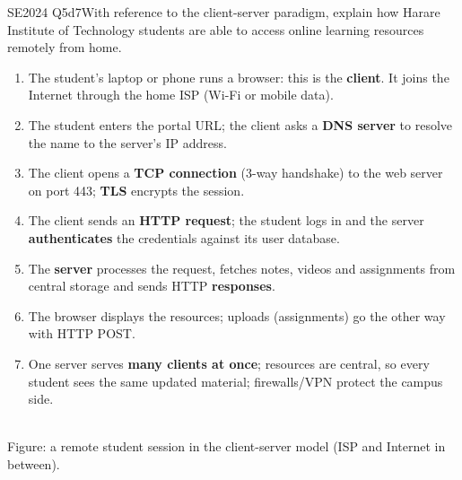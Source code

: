 \documentclass[10pt]{article}
\newcommand{\figcap}[1]{{\scriptsize\color{midgrey}#1}}
\begin{document}
\begin{pastq}{SE2024 Q5d}{7}With reference to the client-server paradigm, explain how Harare Institute of Technology students are able to access online learning resources remotely from home.\end{pastq}
\begin{ans}
\begin{enumerate}
\item The student's laptop or phone runs a browser: this is the \textbf{client}. It joins the Internet through the home ISP (Wi-Fi or mobile data).
\item The student enters the portal URL; the client asks a \textbf{DNS server} to resolve the name to the server's IP address.
\item The client opens a \textbf{TCP connection} (3-way handshake) to the web server on port 443; \textbf{TLS} encrypts the session.
\item The client sends an \textbf{HTTP request}; the student logs in and the server \textbf{authenticates} the credentials against its user database.
\item The \textbf{server} processes the request, fetches notes, videos and assignments from central storage and sends HTTP \textbf{responses}.
\item The browser displays the resources; uploads (assignments) go the other way with HTTP POST.
\item One server serves \textbf{many clients at once}; resources are central, so every student sees the same updated material; firewalls/VPN protect the campus side.
\end{enumerate}
\begin{center}
\\
\figcap{Figure: a remote student session in the client-server model (ISP and Internet in between).}
\end{center}
\end{ans}
\end{document}
